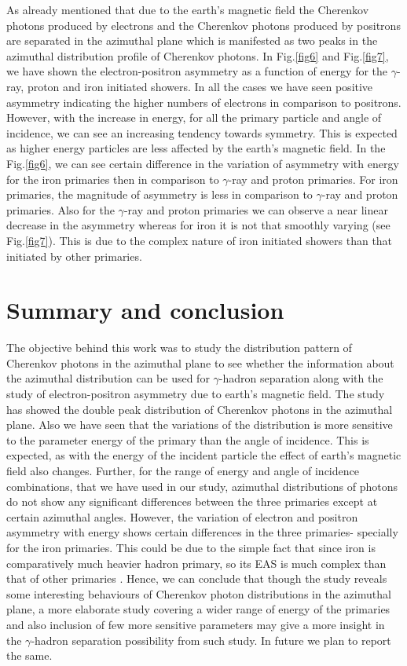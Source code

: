 \documentclass[amsmath,amssymb,showpacs,showkeywords]{revtex4}
\begin{document}
As already mentioned that due to the earth's magnetic field the Cherenkov 
photons produced by electrons and the Cherenkov photons produced by positrons 
are separated in the azimuthal plane which is manifested as two peaks in the 
azimuthal distribution profile of Cherenkov photons. In Fig.\ref{fig6} and 
Fig.\ref{fig7}, we have 
shown the electron-positron asymmetry as a function of energy for the 
$\gamma$-ray, proton and iron initiated showers. In all the cases we have seen 
positive asymmetry indicating the higher numbers of electrons in comparison to 
positrons. However, with the increase in energy, for all the 
primary particle and angle of incidence, we can see an increasing 
tendency towards symmetry. This is expected as higher energy particles are 
less affected by the earth's magnetic field. In the Fig.\ref{fig6}, we can see 
certain difference in the variation of asymmetry with energy for the iron 
primaries then in comparison to $\gamma$-ray and proton primaries. For iron primaries, 
the magnitude of asymmetry is less in comparison to $\gamma$-ray and proton
primaries. Also for the $\gamma$-ray and proton primaries we can observe a 
near linear decrease in the asymmetry whereas for iron it is not that smoothly 
varying (see Fig.\ref{fig7}). This is due to the complex nature of iron 
initiated showers than that initiated by other primaries.

\section{Summary and conclusion}
\label{sec4}
The objective behind this work was to study the distribution pattern of 
Cherenkov photons in the azimuthal plane to see whether the 
information about the azimuthal distribution can be used for $\gamma$-hadron 
separation along with the study of electron-positron asymmetry due to earth's 
magnetic field. The study has showed the double peak distribution of Cherenkov 
photons in the azimuthal plane. Also we have seen that the variations of the 
distribution is more sensitive to the parameter energy of the primary than the angle of incidence. This is expected, as with the energy of the incident 
particle the effect of earth's magnetic field also changes. Further, for the 
range of energy and angle of incidence combinations, that we have used in our 
study, azimuthal distributions of photons do not show any significant 
differences between the three primaries except at certain azimuthal angles. 
However, the variation of electron and positron asymmetry with energy shows 
certain differences in the three primaries- specially for the iron primaries.
This could be due to the simple fact that since iron is comparatively much 
heavier hadron primary, so its EAS is much complex than that of other 
primaries \cite{Hazarika, Das}. Hence, we can conclude that though the study 
reveals some interesting behaviours of Cherenkov photon distributions in the 
azimuthal plane, a more elaborate study covering a wider range of energy of 
the primaries and also inclusion of few more sensitive parameters may give a 
more insight in the $\gamma$-hadron separation possibility from such study. In 
future we plan to report the same.
\end{document}
